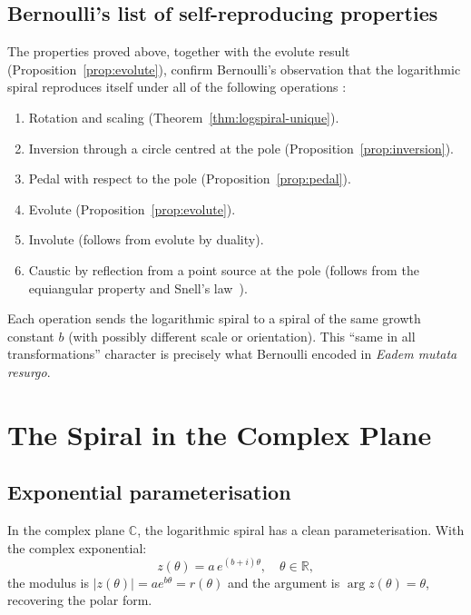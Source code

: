 \subsection{Bernoulli's list of self-reproducing properties}
\label{subsec:17-bernoulli-list}

The properties proved above, together with the evolute result
(Proposition~\ref{prop:evolute}), confirm Bernoulli's observation
that the logarithmic spiral reproduces itself under all of the
following operations \cite{boyer_history}:

\begin{enumerate}
  \item Rotation and scaling (Theorem~\ref{thm:logspiral-unique}).
  \item Inversion through a circle centred at the pole
        (Proposition~\ref{prop:inversion}).
  \item Pedal with respect to the pole
        (Proposition~\ref{prop:pedal}).
  \item Evolute (Proposition~\ref{prop:evolute}).
  \item Involute (follows from evolute by duality).
  \item Caustic by reflection from a point source at the pole
        (follows from the equiangular property and Snell's
        law~\cite{kappraff_connections}).
\end{enumerate}

Each operation sends the logarithmic spiral to a spiral of the
same growth constant \(b\) (with possibly different scale or
orientation).  This ``same in all transformations'' character is
precisely what Bernoulli encoded in \textit{Eadem mutata resurgo}.

\section{The Spiral in the Complex Plane}
\label{sec:17-complex}

\subsection{Exponential parameterisation}
\label{subsec:17-exp-param}

In the complex plane \(\mathbb{C}\), the logarithmic spiral has
a clean parameterisation.  With the complex exponential:
\begin{equation}\label{eq:complex-spiral}
  z(\theta) = a\,e^{(b+i)\theta}, \quad \theta \in \mathbb{R},
\end{equation}
the modulus is \(|z(\theta)| = ae^{b\theta} = r(\theta)\) and the
argument is \(\arg z(\theta) = \theta\), recovering the polar form.

